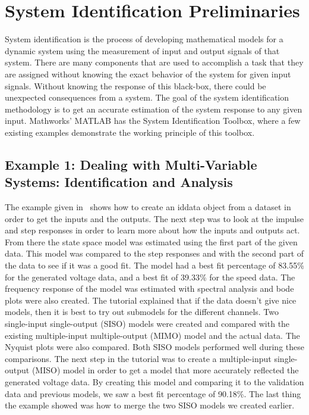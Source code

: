 \documentclass[journal,twoside,web]{ieeecolor}
\begin{document}
\section{System Identification Preliminaries}

System identification is the process of developing mathematical models for a dynamic system using the measurement of input and output signals of that system. There are many components that are used to accomplish a task that they are assigned without knowing the exact behavior of the system for given input signals. Without knowing the response of this black-box, there could be unexpected consequences from a system. The goal of the system identification methodology is to get an accurate estimation of the system response to any given input. Mathworks' MATLAB has the System Identification Toolbox, where a few existing examples demonstrate the working principle of this toolbox.

\subsection{Example 1: Dealing with Multi-Variable Systems: Identification and Analysis}
\label{sec:sysID-Example1}

The example given in~\cite{example1} shows how to create an iddata object from a
dataset in order to get the inputs and the outputs. The next step was to look at
the impulse and step responses in order to learn more about how the inputs and
outputs act. From there the state space model was estimated using the first part
of the given data. This model was compared to the step responses and with the
second part of the data to see if it was a good fit. The model had a best fit
percentage of 83.55\% for the generated voltage data, and a best fit of 39.33\%
for the speed data. The frequency response of the model was estimated with
spectral analysis and bode plots were also created. The tutorial explained that
if the data doesn’t give nice models, then it is best to try out submodels for
the different channels. Two single-input single-output (SISO) models were
created and compared with the existing multiple-input multiple-output (MIMO)
model and the actual data. The Nyquist plots were also compared. Both SISO
models performed well during these comparisons. The next step in the tutorial
was to create a multiple-input single-output (MISO) model in order to get a
model that more accurately reflected the generated voltage data. By creating
this model and comparing it to the validation data and previous models, we saw a
best fit percentage of 90.18\%. The last thing the example showed was how to
merge the two SISO models we created earlier.
\end{document}
